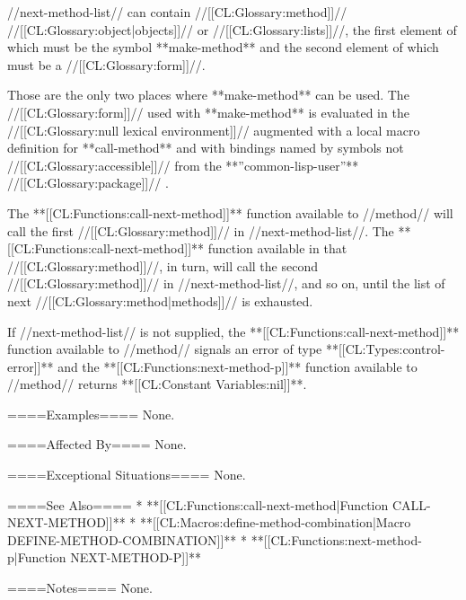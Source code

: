 //next-method-list// can contain //[[CL:Glossary:method]]// //[[CL:Glossary:object|objects]]// or //[[CL:Glossary:lists]]//, the first element of which must be the symbol **make-method** and the second element of which must be a //[[CL:Glossary:form]]//.

Those are the only two places where **make-method** can be used. The //[[CL:Glossary:form]]// used with **make-method** is evaluated in the //[[CL:Glossary:null lexical environment]]// augmented with a local macro definition for **call-method** and with bindings named by symbols not //[[CL:Glossary:accessible]]// from the **''common-lisp-user''** //[[CL:Glossary:package]]// .

The **[[CL:Functions:call-next-method]]** function available to //method// will call the first //[[CL:Glossary:method]]// in //next-method-list//. The **[[CL:Functions:call-next-method]]** function available in that //[[CL:Glossary:method]]//, in turn, will call the second //[[CL:Glossary:method]]// in //next-method-list//, and so on, until the list of next //[[CL:Glossary:method|methods]]// is exhausted.

If //next-method-list// is not supplied, the **[[CL:Functions:call-next-method]]** function available to //method// signals an error of type **[[CL:Types:control-error]]** and the **[[CL:Functions:next-method-p]]** function available to //method// returns {**[[CL:Constant Variables:nil]]**}.

====Examples====
None.

====Affected By====
None.

====Exceptional Situations====
None.

====See Also====
  * **[[CL:Functions:call-next-method|Function CALL-NEXT-METHOD]]**
  * **[[CL:Macros:define-method-combination|Macro DEFINE-METHOD-COMBINATION]]**
  * **[[CL:Functions:next-method-p|Function NEXT-METHOD-P]]**

====Notes====
None.

